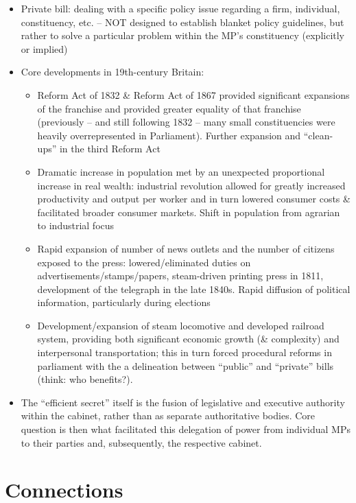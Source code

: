 \documentclass[12pt]{article}
\begin{document}
\begin{itemize}[leftmargin=*, itemsep=4pt]
    \item Private bill: dealing with a specific policy issue regarding a firm, individual, constituency, etc. -- NOT designed to establish blanket policy guidelines, but rather to solve a particular problem within the MP's constituency (explicitly or implied)
    \item Core developments in 19th-century Britain:
    \begin{itemize}
        \item Reform Act of 1832 \& Reform Act of 1867 provided significant expansions of the franchise and provided greater equality of that franchise (previously -- and still following 1832 -- many small constituencies were heavily overrepresented in Parliament). Further expansion and ``clean-ups'' in the third Reform Act
        \item Dramatic increase in population met by an unexpected proportional increase in real wealth: industrial revolution allowed for greatly increased productivity and output per worker and in turn lowered consumer costs \& facilitated broader consumer markets. Shift in population from agrarian to industrial focus
        \item Rapid expansion of number of news outlets and the number of citizens exposed to the press: lowered/eliminated duties on advertisements/stamps/papers, steam-driven printing press in 1811, development of the telegraph in the late 1840s. Rapid diffusion of political information, particularly during elections
        \item Development/expansion of steam locomotive and developed railroad system, providing both significant economic growth (\& complexity) and interpersonal transportation; this in turn forced procedural reforms in parliament with the a delineation between ``public'' and ``private'' bills (think: who benefits?).
    \end{itemize}
    \item The ``efficient secret'' itself is the fusion of legislative and executive authority within the cabinet, rather than as separate authoritative bodies. Core question is then what facilitated this delegation of power from individual MPs to their parties and, subsequently, the respective cabinet.
\end{itemize}


\section{Connections}
\end{document}
